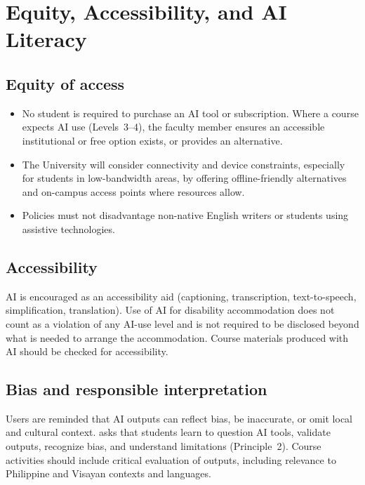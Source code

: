 \section{Equity, Accessibility, and AI Literacy}\label{sec:equity}

\subsection{Equity of access}
\begin{itemize}
  \item No student is required to purchase an AI tool or subscription. Where a course expects AI use (Levels~3--4), the faculty member ensures an accessible institutional or free option exists, or provides an alternative.
  \item The University will consider connectivity and device constraints, especially for students in low-bandwidth areas, by offering offline-friendly alternatives and on-campus access points where resources allow.
  \item Policies must not disadvantage non-native English writers or students using assistive technologies.
\end{itemize}

\subsection{Accessibility}
AI is encouraged as an accessibility aid (captioning, transcription, text-to-speech, simplification, translation). Use of AI for disability accommodation does not count as a violation of any AI-use level and is not required to be disclosed beyond what is needed to arrange the accommodation. Course materials produced with AI should be checked for accessibility.

\subsection{Bias and responsible interpretation}
Users are reminded that AI outputs can reflect bias, be inaccurate, or omit local and cultural context. \cmo{} asks that students learn to question AI tools, validate outputs, recognize bias, and understand limitations (Principle~2). Course activities should include critical evaluation of outputs, including relevance to Philippine and Visayan contexts and languages.

